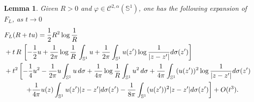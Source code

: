 \documentclass[10pt,reqno,english]{amsart}
\newtheorem{lemma}{Lemma}[section]
\theoremstyle{definition}
\numberwithin{equation}{section}
\begin{document}
\begin{lemma}
\label{FL2ordine}
Given $R>0$ and $\varphi\in\mathcal C^{2,\alpha}(\mathbb S^{1})$, one has the following expansion of $F_L $, as $t\to0$
\begin{align*}
    &F_L (R+tu)= {1 \over 2}  R^2 \log {1\over R}\\
    &+ t  \, R \, \left[ -{1\over 2} u + {1\over 2\pi} \log {1\over R} \, \int_{\mathbb{S}^1} u + {1\over 2\pi}  \int_{\mathbb{S}^1} u(z') \log {1\over |z-z'|} d\sigma (z')\right]\\
    &+t^2\left[-\frac{1}{4}u^2-\frac{1}{2\pi} u \int_{\mathbb{S}^1} u\,d\sigma+\frac{1}{4\pi} \log {1\over R}\int_{\mathbb{S}^1} u^2\,d\sigma+\frac{1}{4\pi}\int_{\mathbb{S}^1} (u(z'))^2 \log {1\over |z-z'|} d\sigma (z')\right.\\
&\left.\qquad\quad+\frac{1}{4\pi}u(z)\int_{\mathbb{S}^1} u(z')|z-z'| d\sigma (z')-\frac{1}{8\pi}\int_{\mathbb{S}^1} (u(z'))^2|z-z'| d\sigma (z')\right]+ O(t^3).
\end{align*}
\end{lemma}
\end{document}
